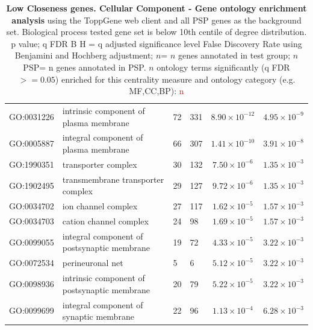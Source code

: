 \begin{table}[ht]
\begin{adjustbox}{width=\textwidth}
\begin{tabular}{@{}clllcl@{}}
  \midrule
GO:0031226 & intrinsic component of plasma membrane & 72 & 331 & $8.90 \times 10^{-12}$ & $4.95 \times 10^{-9}$ \\ 
  GO:0005887 & integral component of plasma membrane & 66 & 307 & $1.41 \times 10^{-10}$ & $3.91 \times 10^{-8}$ \\ 
  GO:1990351 & transporter complex & 30 & 132 & $7.50 \times 10^{-6}$ & $1.35 \times 10^{-3}$ \\ 
  GO:1902495 & transmembrane transporter complex & 29 & 127 & $9.72 \times 10^{-6}$ & $1.35 \times 10^{-3}$ \\ 
  GO:0034702 & ion channel complex & 27 & 117 & $1.62 \times 10^{-5}$ & $1.57 \times 10^{-3}$ \\ 
  GO:0034703 & cation channel complex & 24 & 98 & $1.69 \times 10^{-5}$ & $1.57 \times 10^{-3}$ \\ 
  GO:0099055 & integral component of postsynaptic membrane & 19 & 72 & $4.33 \times 10^{-5}$ & $3.22 \times 10^{-3}$ \\ 
  GO:0072534 & perineuronal net & 5 & 6 & $5.12 \times 10^{-5}$ & $3.22 \times 10^{-3}$ \\ 
  GO:0098936 & intrinsic component of postsynaptic membrane & 20 & 79 & $5.22 \times 10^{-5}$ & $3.22 \times 10^{-3}$ \\ 
  GO:0099699 & integral component of synaptic membrane & 22 & 96 & $1.13 \times 10^{-4}$ & $6.28 \times 10^{-3}$ \\ 
   \bottomrule
\end{tabular}
\end{adjustbox}
\caption[Gene ontology enrichment Low Closeness genes Cellular Component of genes above 90th centile of distribution]{\textbf{Low Closeness genes. Cellular Component - Gene ontology enrichment analysis} using the ToppGene web client and all PSP genes as the background set.  Biological process tested gene set is below 10th centile of degree distribution.  p value; q FDR B H = q adjusted significance level False Discovery Rate using Benjamini and Hochberg adjustment; $n$= $n$ genes annotated in test group; $n$ PSP= n genes annotated in PSP. $n$ ontology terms significantly (q FDR$>=0.05$) enriched for this centrality measure and ontology category (e.g. MF,CC,BP): \textcolor{red}{n}} 

\label{tab:ToppGENE GO: Cellular Component. clo 10 centile cwpsp.txtp = p value; q FDR B H = q adjusted significance level False Discovery Rate using Benjamini and Hochberg adjustment; n= n genes annotated in test group; n PSP= n genes annotated in PSP}
\end{table}


